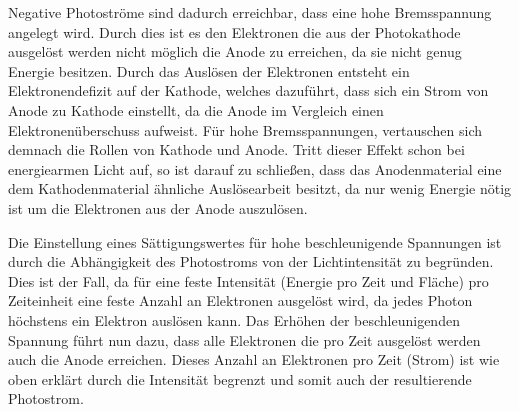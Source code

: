 Negative Photoströme sind dadurch erreichbar, dass eine hohe Bremsspannung 
angelegt wird. Durch dies ist es den Elektronen die aus der Photokathode ausgelöst 
werden nicht möglich die Anode zu erreichen, da sie nicht genug Energie besitzen.
Durch das Auslösen der Elektronen entsteht ein Elektronendefizit auf der 
Kathode, welches dazuführt, dass sich ein Strom von Anode zu Kathode einstellt,
da die Anode im Vergleich einen Elektronenüberschuss aufweist. Für hohe 
Bremsspannungen, vertauschen sich demnach die Rollen von Kathode und Anode.
Tritt dieser Effekt schon bei energiearmen Licht auf, so ist darauf zu schließen,
dass das Anodenmaterial eine dem Kathodenmaterial ähnliche Auslösearbeit besitzt,
da nur wenig Energie nötig ist um die Elektronen aus der Anode auszulösen.

Die Einstellung eines Sättigungswertes für hohe beschleunigende Spannungen ist 
durch die Abhängigkeit des Photostroms von der Lichtintensität zu begründen.     
Dies ist der Fall, da für eine feste Intensität (Energie pro Zeit und Fläche)
pro Zeiteinheit eine feste Anzahl an Elektronen ausgelöst wird, da jedes 
Photon höchstens ein Elektron auslösen kann. Das Erhöhen der beschleunigenden 
Spannung führt nun dazu, dass alle Elektronen die pro Zeit ausgelöst werden auch die 
Anode erreichen. Dieses Anzahl an Elektronen pro Zeit (Strom) ist wie oben erklärt 
durch die Intensität begrenzt und somit auch der resultierende Photostrom.   
 
 

   